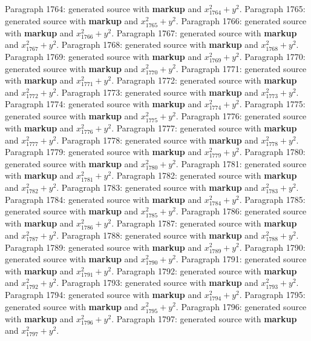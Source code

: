 \documentclass{article}
\begin{document}
Paragraph 1764: generated source with \textbf{markup} and $x_{1764}^2 + y^2$.
Paragraph 1765: generated source with \textbf{markup} and $x_{1765}^2 + y^2$.
Paragraph 1766: generated source with \textbf{markup} and $x_{1766}^2 + y^2$.
Paragraph 1767: generated source with \textbf{markup} and $x_{1767}^2 + y^2$.
Paragraph 1768: generated source with \textbf{markup} and $x_{1768}^2 + y^2$.
Paragraph 1769: generated source with \textbf{markup} and $x_{1769}^2 + y^2$.
Paragraph 1770: generated source with \textbf{markup} and $x_{1770}^2 + y^2$.
Paragraph 1771: generated source with \textbf{markup} and $x_{1771}^2 + y^2$.
Paragraph 1772: generated source with \textbf{markup} and $x_{1772}^2 + y^2$.
Paragraph 1773: generated source with \textbf{markup} and $x_{1773}^2 + y^2$.
Paragraph 1774: generated source with \textbf{markup} and $x_{1774}^2 + y^2$.
Paragraph 1775: generated source with \textbf{markup} and $x_{1775}^2 + y^2$.
Paragraph 1776: generated source with \textbf{markup} and $x_{1776}^2 + y^2$.
Paragraph 1777: generated source with \textbf{markup} and $x_{1777}^2 + y^2$.
Paragraph 1778: generated source with \textbf{markup} and $x_{1778}^2 + y^2$.
Paragraph 1779: generated source with \textbf{markup} and $x_{1779}^2 + y^2$.
Paragraph 1780: generated source with \textbf{markup} and $x_{1780}^2 + y^2$.
Paragraph 1781: generated source with \textbf{markup} and $x_{1781}^2 + y^2$.
Paragraph 1782: generated source with \textbf{markup} and $x_{1782}^2 + y^2$.
Paragraph 1783: generated source with \textbf{markup} and $x_{1783}^2 + y^2$.
Paragraph 1784: generated source with \textbf{markup} and $x_{1784}^2 + y^2$.
Paragraph 1785: generated source with \textbf{markup} and $x_{1785}^2 + y^2$.
Paragraph 1786: generated source with \textbf{markup} and $x_{1786}^2 + y^2$.
Paragraph 1787: generated source with \textbf{markup} and $x_{1787}^2 + y^2$.
Paragraph 1788: generated source with \textbf{markup} and $x_{1788}^2 + y^2$.
Paragraph 1789: generated source with \textbf{markup} and $x_{1789}^2 + y^2$.
Paragraph 1790: generated source with \textbf{markup} and $x_{1790}^2 + y^2$.
Paragraph 1791: generated source with \textbf{markup} and $x_{1791}^2 + y^2$.
Paragraph 1792: generated source with \textbf{markup} and $x_{1792}^2 + y^2$.
Paragraph 1793: generated source with \textbf{markup} and $x_{1793}^2 + y^2$.
Paragraph 1794: generated source with \textbf{markup} and $x_{1794}^2 + y^2$.
Paragraph 1795: generated source with \textbf{markup} and $x_{1795}^2 + y^2$.
Paragraph 1796: generated source with \textbf{markup} and $x_{1796}^2 + y^2$.
Paragraph 1797: generated source with \textbf{markup} and $x_{1797}^2 + y^2$.
\end{document}
